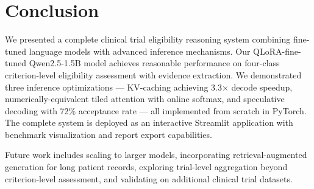\documentclass[conference]{IEEEtran}
\begin{document}
\section{Conclusion}

We presented a complete clinical trial eligibility reasoning system combining fine-tuned language models with advanced inference mechanisms. Our QLoRA-fine-tuned Qwen2.5-1.5B model achieves reasonable performance on four-class criterion-level eligibility assessment with evidence extraction. We demonstrated three inference optimizations — KV-caching achieving 3.3$\times$ decode speedup, numerically-equivalent tiled attention with online softmax, and speculative decoding with 72\% acceptance rate — all implemented from scratch in PyTorch. The complete system is deployed as an interactive Streamlit application with benchmark visualization and report export capabilities.

Future work includes scaling to larger models, incorporating retrieval-augmented generation for long patient records, exploring trial-level aggregation beyond criterion-level assessment, and validating on additional clinical trial datasets.

\end{document}
